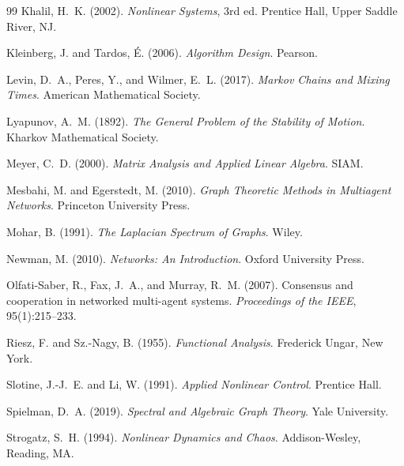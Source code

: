 ﻿\documentclass[12pt, a4paper]{article}
\theoremstyle{definition}
\theoremstyle{remark}
\begin{document}
\begin{thebibliography}{99}
	Khalil, H.~K. (2002).
	\newblock \textit{Nonlinear Systems}, 3rd ed.
	\newblock Prentice Hall, Upper Saddle River, NJ.
	
	Kleinberg, J. and Tardos, É. (2006).
	\newblock \textit{Algorithm Design}.
	\newblock Pearson.
	
	Levin, D.~A., Peres, Y., and Wilmer, E.~L. (2017).
	\newblock \textit{Markov Chains and Mixing Times}.
	\newblock American Mathematical Society.
	
	Lyapunov, A.~M. (1892).
	\newblock \textit{The General Problem of the Stability of Motion}.
	\newblock Kharkov Mathematical Society.
	
	Meyer, C.~D. (2000).
	\newblock \textit{Matrix Analysis and Applied Linear Algebra}.
	\newblock SIAM.
	
	Mesbahi, M. and Egerstedt, M. (2010).
	\newblock \textit{Graph Theoretic Methods in Multiagent Networks}.
	\newblock Princeton University Press.
	
	Mohar, B. (1991).
	\newblock \textit{The Laplacian Spectrum of Graphs}.
	\newblock Wiley.
	
	Newman, M. (2010).
	\newblock \textit{Networks: An Introduction}.
	\newblock Oxford University Press.
	
	Olfati-Saber, R., Fax, J.~A., and Murray, R.~M. (2007).
	\newblock Consensus and cooperation in networked multi-agent systems.
	\newblock \textit{Proceedings of the IEEE}, 95(1):215--233.
	
	Riesz, F. and Sz.-Nagy, B. (1955).
	\newblock \textit{Functional Analysis}.
	\newblock Frederick Ungar, New York.
	
	Slotine, J.-J.~E. and Li, W. (1991).
	\newblock \textit{Applied Nonlinear Control}.
	\newblock Prentice Hall.
	
	Spielman, D.~A. (2019).
	\newblock \textit{Spectral and Algebraic Graph Theory}.
	\newblock Yale University.
	
	Strogatz, S.~H. (1994).
	\newblock \textit{Nonlinear Dynamics and Chaos}.
	\newblock Addison-Wesley, Reading, MA.
	

\end{thebibliography}
\end{document}
